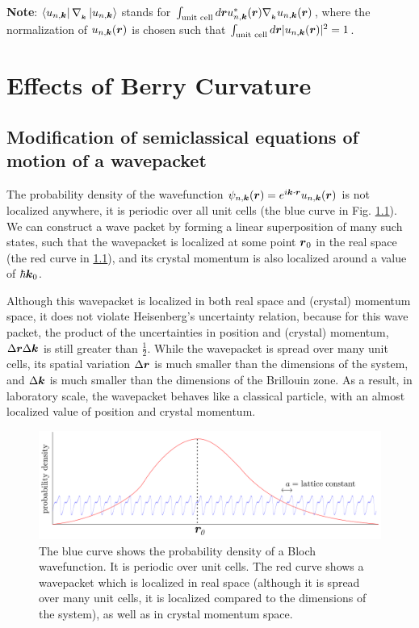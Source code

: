 \documentclass{report}
\renewcommand\vec[1]{\ensuremath\boldsymbol{#1}} %
\begin{document}
\textbf{Note}: $\bra{u_{n,\vec{k}}}\nabla_{_{\vec{k}}} \ket{u_{n,\vec{k}}}$ stands for $\int_\text{unit cell} d\vec{r} u^*_{n,\vec{k}} (\vec{r}) \nabla_{_{\vec{k}}} u_{n,\vec{k}}(\vec{r})$, where the normalization of $u_{n,\vec{k}}(\vec{r})$ is chosen such that $\int_\text{unit cell} d\vec{r} |u_{n,\vec{k}} (\vec{r})|^2 = 1$.
\chapter{Effects of Berry Curvature}
\section{Modification of semiclassical equations of motion of a wavepacket}
The probability density of the wavefunction $\psi_{n, \vec{k}} (\vec{r}) = e^{i \vec{k}\cdot \vec{r}} u_{n,\vec{k}} (\vec{r})$ is not localized anywhere, it is periodic over all unit cells (the blue curve in Fig. \ref{fig:wavepacket-and-bloch-wave}). We can construct a wave packet by forming a linear superposition of many such states, such that the wavepacket is localized at some point $\vec{r}_0$ in the real space (the red curve in \ref{fig:wavepacket-and-bloch-wave}), and its crystal momentum is also localized around a value of $\hbar \vec{k}_0$.

Although this wavepacket is localized in both real space and (crystal) momentum space, it does not violate Heisenberg's uncertainty relation, because for this wave packet, the product of the uncertainties in position and (crystal) momentum, $\Delta \vec{r} \Delta \vec{k}$ is still greater than $\frac{1}{2}$. While the wavepacket is spread over many unit cells, its spatial variation $\Delta \vec{r}$ is much smaller than the dimensions of the system, and $\Delta \vec{k}$ is much smaller than the dimensions of the Brillouin zone. As a result, in laboratory scale, the wavepacket behaves like a classical particle, with an almost localized value of position and crystal momentum.

\begin{figure}[h!]
	\centering
	\includegraphics[width=0.7\linewidth]{wavepacket-and-Bloch-wave}
	\caption{The blue curve shows the probability density of a Bloch wavefunction. It is periodic over unit cells. The red curve shows a wavepacket which is localized in real space (although it is spread over many unit cells, it is localized compared to the dimensions of the system), as well as in crystal momentum space.}
	\label{fig:wavepacket-and-bloch-wave}
\end{figure}
\end{document}
